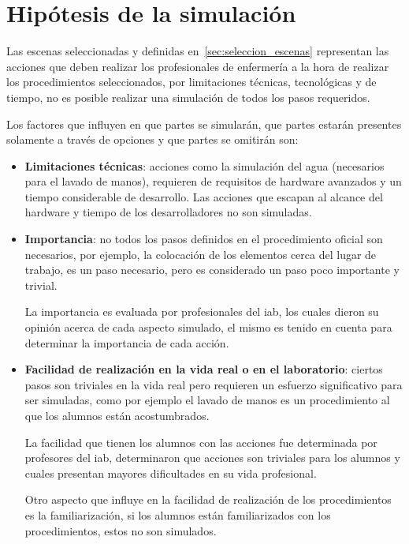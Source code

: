 \section{Hipótesis de la simulación}
\label{sec:hipotesis}



Las escenas seleccionadas y definidas en~\ref{sec:seleccion_escenas} representan
las acciones que deben realizar los profesionales de enfermería a la hora de
realizar los procedimientos seleccionados, por limitaciones técnicas,
tecnológicas y de tiempo, no es posible realizar una simulación de todos los
pasos requeridos.

Los factores que influyen en que partes se simularán, que partes estarán
presentes solamente a través de opciones y que partes se omitirán son:

\begin{itemize}

    \item \textbf{Limitaciones técnicas}: acciones como la simulación del agua
        (necesarios para el lavado de manos), requieren de requisitos de
        hardware avanzados y un tiempo considerable de desarrollo. Las acciones
        que escapan al alcance del hardware y tiempo de los desarrolladores no
        son simuladas.

    \item \textbf{Importancia}: no todos los pasos definidos en el procedimiento
        oficial son necesarios, por ejemplo, la colocación de los elementos
        cerca del lugar de trabajo, es un paso necesario, pero es considerado un
        paso poco importante y trivial.

        La importancia es evaluada por profesionales del \Gls{iab}, los cuales
        dieron su opinión acerca de cada aspecto simulado, el mismo es tenido en
        cuenta para determinar la importancia de cada acción.

    \item \textbf{Facilidad de realización en la vida real o en el laboratorio}:
        ciertos pasos son triviales en la vida real pero requieren un esfuerzo
        significativo para ser simuladas, como por ejemplo el lavado de manos es
        un procedimiento al que los alumnos están acostumbrados.

        La facilidad que tienen los alumnos con las acciones fue determinada por
        profesores del \Gls{iab}, determinaron que acciones son triviales para
        los alumnos y cuales presentan mayores dificultades en su vida
        profesional.

        Otro aspecto que influye en la facilidad de realización de los
        procedimientos es la familiarización, si los alumnos están
        familiarizados con los procedimientos, estos no son simulados.

\end{itemize}

